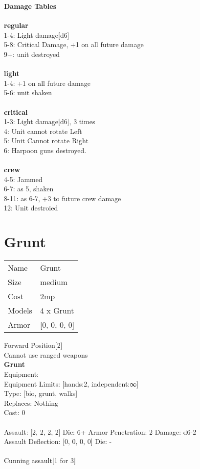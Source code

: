 {\bf Damage Tables} \\
\ \\ {\bf regular } \\
1-4: Light damage[d6] \\
5-8: Critical Damage, +1 on all future damage \\
9+: unit destroyed \\
\ \\ {\bf light } \\
1-4: +1 on all future damage \\
5-6: unit shaken \\
\ \\ {\bf critical } \\
1-3: Light damage[d6], 3 times \\
4: Unit cannot rotate Left \\
5: Unit Cannot rotate Right \\
6: Harpoon guns destroyed. \\
\ \\ {\bf crew } \\
4-5: Jammed \\
6-7: as 5, shaken \\
8-11: as 6-7, +3 to future crew damage \\
12: Unit destroied \\










\pagebreak\pagebreak

\section{ Grunt }

\begin{tabular}{ll}
  Name & Grunt \\
  Size & medium\\
  Cost & 2mp\\
  Models & 4 x Grunt\\
  Armor & [0, 0, 0, 0]\\
\end{tabular}

\noindent Forward Position[2]\\ 
Cannot use ranged weapons\\ 


{\bf Grunt } \\
Equipment:  \\
Equipment Limits: [hands:2, independent:∞] \\
Type: [bio, grunt, walks] \\
Replaces: Nothing \\
Cost: 0\\
\ \\
Assault: [2, 2, 2, 2] Die: 6+ Armor Penetration: 2 Damage: d6-2 \\
Assault Deflection: [0, 0, 0, 0] Die: -\\
\\ 
Cunning assault[1 for 3]\\ 
 
